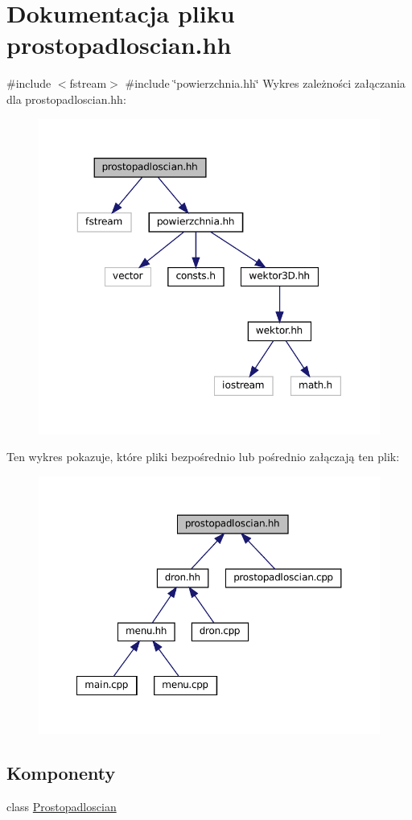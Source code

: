\hypertarget{prostopadloscian_8hh}{}\section{Dokumentacja pliku prostopadloscian.\+hh}
\label{prostopadloscian_8hh}
{\ttfamily \#include $<$fstream$>$}\newline
{\ttfamily \#include \char`\"{}powierzchnia.\+hh\char`\"{}}\newline
Wykres zależności załączania dla prostopadloscian.\+hh\+:\nopagebreak
\begin{figure}[H]
\begin{center}
\leavevmode
\includegraphics[width=350pt]{prostopadloscian_8hh__incl}
\end{center}
\end{figure}
Ten wykres pokazuje, które pliki bezpośrednio lub pośrednio załączają ten plik\+:
\nopagebreak
\begin{figure}[H]
\begin{center}
\leavevmode
\includegraphics[width=350pt]{prostopadloscian_8hh__dep__incl}
\end{center}
\end{figure}
\subsection*{Komponenty}
\begin{DoxyCompactItemize}
\item 
class \mbox{\hyperlink{class_prostopadloscian}{Prostopadloscian}}
\end{DoxyCompactItemize}
